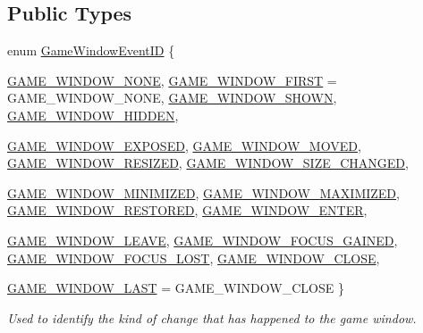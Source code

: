 \subsection*{Public Types}
\begin{DoxyCompactItemize}
\item 
enum \hyperlink{classphys_1_1EventGameWindow_a45225255070513d3cff88cdfea25cc09}{GameWindowEventID} \{ \par
\hyperlink{classphys_1_1EventGameWindow_a45225255070513d3cff88cdfea25cc09ae2a7610e7a32d53ee92bf5fe2764935c}{GAME\_\-WINDOW\_\-NONE}, 
\hyperlink{classphys_1_1EventGameWindow_a45225255070513d3cff88cdfea25cc09a9109b7fb1835941a0519f37a5dc2f938}{GAME\_\-WINDOW\_\-FIRST} =  GAME\_\-WINDOW\_\-NONE, 
\hyperlink{classphys_1_1EventGameWindow_a45225255070513d3cff88cdfea25cc09a2f86504eb791b0181b499bdcb2250d1d}{GAME\_\-WINDOW\_\-SHOWN}, 
\hyperlink{classphys_1_1EventGameWindow_a45225255070513d3cff88cdfea25cc09aa567edb744271aacd02f22f596c46d8d}{GAME\_\-WINDOW\_\-HIDDEN}, 
\par
\hyperlink{classphys_1_1EventGameWindow_a45225255070513d3cff88cdfea25cc09ada7c1c23c6da30aee3debba363379be4}{GAME\_\-WINDOW\_\-EXPOSED}, 
\hyperlink{classphys_1_1EventGameWindow_a45225255070513d3cff88cdfea25cc09a20f2c7da3eb4d22b4c2f92788daabfef}{GAME\_\-WINDOW\_\-MOVED}, 
\hyperlink{classphys_1_1EventGameWindow_a45225255070513d3cff88cdfea25cc09a03d9f1f081bbca89a4de1f13f1c150e9}{GAME\_\-WINDOW\_\-RESIZED}, 
\hyperlink{classphys_1_1EventGameWindow_a45225255070513d3cff88cdfea25cc09ae85ae9b84cd785e0eafdb3e4ade17b7e}{GAME\_\-WINDOW\_\-SIZE\_\-CHANGED}, 
\par
\hyperlink{classphys_1_1EventGameWindow_a45225255070513d3cff88cdfea25cc09a96e49680f8a4dc93d34056d03882a691}{GAME\_\-WINDOW\_\-MINIMIZED}, 
\hyperlink{classphys_1_1EventGameWindow_a45225255070513d3cff88cdfea25cc09a8d43573619988df44708ed9f6cbfe737}{GAME\_\-WINDOW\_\-MAXIMIZED}, 
\hyperlink{classphys_1_1EventGameWindow_a45225255070513d3cff88cdfea25cc09a948c8fd4eb2791edbc1d1db03a7d831d}{GAME\_\-WINDOW\_\-RESTORED}, 
\hyperlink{classphys_1_1EventGameWindow_a45225255070513d3cff88cdfea25cc09a277538cd68003ba6910fa502223b1211}{GAME\_\-WINDOW\_\-ENTER}, 
\par
\hyperlink{classphys_1_1EventGameWindow_a45225255070513d3cff88cdfea25cc09ac8fa0e63e6a667cec270ef1f6d22637f}{GAME\_\-WINDOW\_\-LEAVE}, 
\hyperlink{classphys_1_1EventGameWindow_a45225255070513d3cff88cdfea25cc09af1af852f11ba0c2f11b7a2b8131e3bb3}{GAME\_\-WINDOW\_\-FOCUS\_\-GAINED}, 
\hyperlink{classphys_1_1EventGameWindow_a45225255070513d3cff88cdfea25cc09a0badc0a56b136f063cd0ae3cca06e77a}{GAME\_\-WINDOW\_\-FOCUS\_\-LOST}, 
\hyperlink{classphys_1_1EventGameWindow_a45225255070513d3cff88cdfea25cc09a7dc01efd74badd9247854967433953d7}{GAME\_\-WINDOW\_\-CLOSE}, 
\par
\hyperlink{classphys_1_1EventGameWindow_a45225255070513d3cff88cdfea25cc09ad6a39df788ee97efda258b46a776d61a}{GAME\_\-WINDOW\_\-LAST} =  GAME\_\-WINDOW\_\-CLOSE
 \}
\begin{DoxyCompactList}\small\item\em Used to identify the kind of change that has happened to the game window. \item\end{DoxyCompactList}\end{DoxyCompactItemize}
